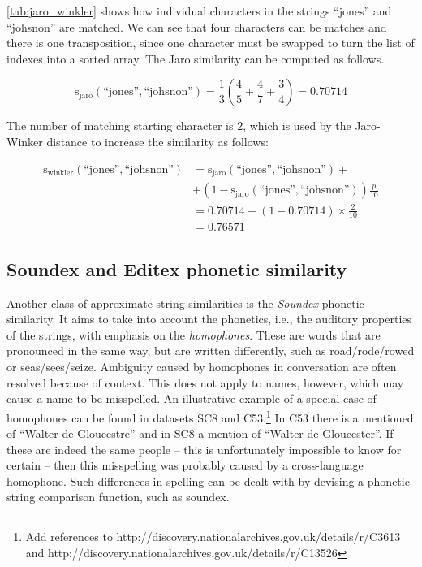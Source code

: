 \cref{tab:jaro_winkler} shows how individual characters in the strings ``jones'' and ``johsnon'' are matched.
We can see that four characters can be matches and there is one transposition, since one character must be swapped to turn the list of indexes into a sorted array.
The Jaro similarity can be computed as follows.

\begin{equation*}
    \mathrm{s_{jaro}}(\text{``jones''}, \text{``johsnon''}) = \frac{1}{3} \left(\frac{4}{5} + \frac{4}{7} + \frac{3}{4} \right) = 0.70714
\end{equation*}

\noindent The number of matching starting character is $2$, which is used by the Jaro-Winker distance to increase the similarity as follows:

\begin{align*}
    \mathrm{s_{winkler}}(\text{``jones''}, \text{``johsnon''}) &= \mathrm{s_{jaro}}(\text{``jones''}, \text{``johsnon''}) + \\
    &+(1-\mathrm{s_{jaro}}(\text{``jones''}, \text{``johsnon''}))\frac{p}{10} \\
    &= 0.70714 + (1 - 0.70714)\times\frac{2}{10} \\
    &= 0.76571
\end{align*}




\subsection{Soundex and Editex phonetic similarity}
\label{subsec:soundex}

Another class of approximate string similarities is the \emph{Soundex} phonetic similarity.
It aims to take into account the phonetics, i.e., the auditory properties of the strings, with emphasis on the \emph{homophones}.
These are words that are pronounced in the same way, but are written differently, such as road/rode/rowed or seas/sees/seize.
Ambiguity caused by homophones in conversation are often resolved because of context.
This does not apply to names, however, which may cause a name to be misspelled.
An illustrative example of a special case of homophones can be found in datasets SC8 and C53.\footnote{Add references to http://discovery.nationalarchives.gov.uk/details/r/C3613 and http://discovery.nationalarchives.gov.uk/details/r/C13526}
In C53 there is a mentioned of ``Walter de Gloucestre'' and in SC8 a mention of ``Walter de Gloucester''.
If these are indeed the same people -- this is unfortunately impossible to know for certain -- then this misspelling was probably caused by a cross-language homophone.
Such differences in spelling can be dealt with by devising a phonetic string comparison function, such as soundex.

